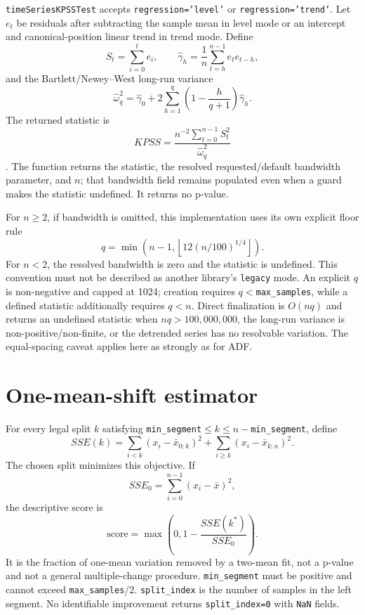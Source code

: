 \documentclass[11pt]{article}
\begin{document}
\texttt{timeSeriesKPSSTest} accepts \texttt{regression='level'} or \texttt{regression='trend'}. Let $e_t$ be residuals after subtracting the sample mean in level mode or an intercept and canonical-position linear trend in trend mode. Define
\[
S_t=\sum_{i=0}^{t}e_i,
\qquad
\widehat\gamma_h=\frac1n\sum_{t=h}^{n-1}e_t e_{t-h},
\]
and the Bartlett/Newey--West long-run variance
\[
\widehat\omega_q^2=\widehat\gamma_0+
2\sum_{h=1}^{q}\left(1-\frac{h}{q+1}\right)\widehat\gamma_h.
\]
The returned statistic is
\[
KPSS=\frac{n^{-2}\sum_{t=0}^{n-1}S_t^2}{\widehat\omega_q^2}
\]
\cite{kpss1992,neweywest1987}. The function returns the statistic, the resolved requested/default bandwidth parameter, and $n$; that bandwidth field remains populated even when a guard makes the statistic undefined. It returns no p-value.

For $n\ge2$, if bandwidth is omitted, this implementation uses its own explicit floor rule
\[
q=\min\left(n-1,\left\lfloor12(n/100)^{1/4}\right\rfloor\right).
\]
For $n<2$, the resolved bandwidth is zero and the statistic is undefined. This convention must not be described as another library's \texttt{legacy} mode. An explicit $q$ is non-negative and capped at 1024; creation requires $q<$\texttt{max\_samples}, while a defined statistic additionally requires $q<n$. Direct finalization is $O(nq)$ and returns an undefined statistic when $nq>100{,}000{,}000$, the long-run variance is non-positive/non-finite, or the detrended series has no resolvable variation. The equal-spacing caveat applies here as strongly as for ADF.

\section{One-mean-shift estimator}

For every legal split $k$ satisfying \texttt{min\_segment}$\le k\le n-$\texttt{min\_segment}, define
\[
SSE(k)=\sum_{i<k}(x_i-\bar x_{0:k})^2+
       \sum_{i\ge k}(x_i-\bar x_{k:n})^2.
\]
The chosen split minimizes this objective. If
\[
SSE_0=\sum_{i=0}^{n-1}(x_i-\bar x)^2,
\]
the descriptive score is
\[
\mathrm{score}=\max\left(0,1-\frac{SSE(k^*)}{SSE_0}\right).
\]
It is the fraction of one-mean variation removed by a two-mean fit, not a p-value and not a general multiple-change procedure. \texttt{min\_segment} must be positive and cannot exceed \texttt{max\_samples}/2. \texttt{split\_index} is the number of samples in the left segment. No identifiable improvement returns \texttt{split\_index=0} with \texttt{NaN} fields.
\end{document}
